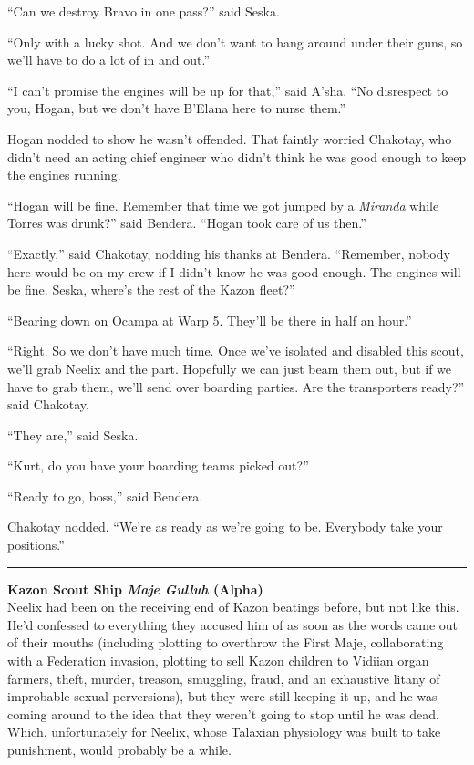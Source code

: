 \documentclass[twoside,letterpaper,12pt]{memoir}
\begin{document}
``Can we destroy Bravo in one pass?'' said Seska.

``Only with a lucky shot. And we don't want to hang around under their guns, so we'll have to do a lot of in and out.''

``I can't promise the engines will be up for that,'' said A'sha. ``No disrespect to you, Hogan, but we don't have B'Elana here to nurse them.''

Hogan nodded to show he wasn't offended. That faintly worried Chakotay, who didn't need an acting chief engineer who didn't think he was good enough to keep the engines running.

``Hogan will be fine. Remember that time we got jumped by a \textit{Miranda} while Torres was drunk?'' said Bendera. ``Hogan took care of us then.''

``Exactly,'' said Chakotay, nodding his thanks at Bendera. ``Remember, nobody here would be on my crew if I didn't know he was good enough. The engines will be fine. Seska, where's the rest of the Kazon fleet?''

``Bearing down on Ocampa at Warp 5. They'll be there in half an hour.''

``Right. So we don't have much time. Once we've isolated and disabled this scout, we'll grab Neelix and the part. Hopefully we can just beam them out, but if we have to grab them, we'll send over boarding parties. Are the transporters ready?'' said Chakotay.

``They are,'' said Seska.

``Kurt, do you have your boarding teams picked out?''

``Ready to go, boss,'' said Bendera.

Chakotay nodded. ``We're as ready as we're going to be. Everybody take your positions.''

\fancybreak{\rule{3cm}{0.4 pt}}
\noindent\textbf{Kazon Scout Ship \textit{Maje Gulluh} (Alpha)}\\

Neelix had been on the receiving end of Kazon beatings before, but not like this. He'd confessed to everything they accused him of as soon as the words came out of their mouths (including plotting to overthrow the First Maje, collaborating with a Federation invasion, plotting to sell Kazon children to Vidiian organ farmers, theft, murder, treason, smuggling, fraud, and an exhaustive litany of improbable sexual perversions), but they were still keeping it up, and he was coming around to the idea that they weren't going to stop until he was dead. Which, unfortunately for Neelix, whose Talaxian physiology was built to take punishment, would probably be a while.
\end{document}
